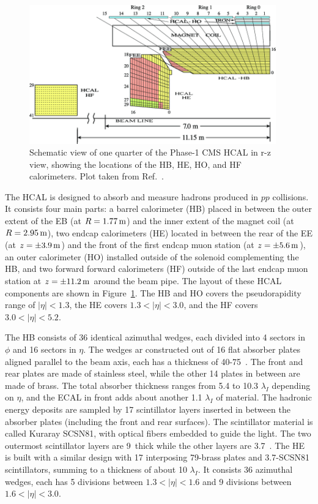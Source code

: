\begin{figure}[!htb]
    \centering
    \captionsetup{justification=justified}
    \includegraphics[width=0.95\textwidth]{pics/LHC_CMS/HCAL.png}
    \caption{Schematic view of one quarter of the Phase-1 CMS HCAL in r-z view,
             showing the locations of the HB, HE, HO, and HF calorimeters.
             Plot taken from Ref.~\cite{Mans:1481837}.}
    \label{fig:cms_hcal}
\end{figure}

The HCAL is designed to absorb and measure hadrons produced in $pp$ collisions.
It consists four main parts: a barrel calorimeter (HB) placed in between the outer extent of the EB (at $R = 1.77 \meter$) and the inner extent of the magnet coil (at $R = 2.95 \meter$),
two endcap calorimeters (HE) located in between the rear of the EE (at $z = \pm 3.9 \meter$) and the front of the first endcap muon station (at $z = \pm 5.6 \meter$),
an outer calorimeter (HO) installed outside of the solenoid complementing the HB,
and two forward forward calorimeters (HF) outside of the last endcap muon station at $z = \pm 11.2 \meter$ around the beam pipe.
The layout of these HCAL components are shown in Figure~\ref{fig:cms_hcal}.
The HB and HO covers the pseudorapidity range of $|\eta| < 1.3$, the HE covers $1.3 < |\eta| < 3.0$,
and the HF covers $3.0 < |\eta| < 5.2$.

The HB consists of 36 identical azimuthal wedges, each divided into 4 sectors in $\phi$ and 16 sectors in $\eta$.
The wedges ar constructed out of 16 flat absorber plates aligned parallel to the beam axis, each has a thickness of 40-75~\mm.
The front and rear plates are made of stainless steel, while the other 14 plates in between are made of brass.
The total absorber thickness ranges from 5.4 to 10.3 $\lambda_{I}$ depending on $\eta$, and the ECAL in front adds about another 1.1 $\lambda_{I}$ of material.
The hadronic energy deposits are sampled by 17 scintillator layers inserted in between the absorber plates (including the front and rear surfaces).
The scintillator material is called Kuraray SCSN81, with optical fibers embedded to guide the light.
The two outermost scintillator layers are 9~\mm thick while the other layers are 3.7~\mm.
The HE is built with a similar design with 17 interposing 79-\mm brass plates and 3.7-\mm SCSN81 scintillators, summing to a thickness of about 10 $\lambda_{I}$.
It consists 36 azimuthal wedges, each has 5 divisions between $1.3 < |\eta| < 1.6$ and 9 divisions between $1.6 < |\eta| < 3.0$.

